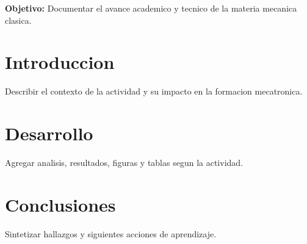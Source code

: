 \documentclass[spanish,letterpaper,oneside]{article}
\begin{document}
\templatePortrait
\templatePagecfg
\onehalfspacing

\begin{abstractd}
\textbf{Objetivo:} Documentar el avance academico y tecnico de la materia mecanica clasica.
\end{abstractd}

\templateIndex
\templateFinalcfg

\section{Introduccion}
Describir el contexto de la actividad y su impacto en la formacion mecatronica.

\section{Desarrollo}
Agregar analisis, resultados, figuras y tablas segun la actividad.

\section{Conclusiones}
Sintetizar hallazgos y siguientes acciones de aprendizaje.



\end{document}
